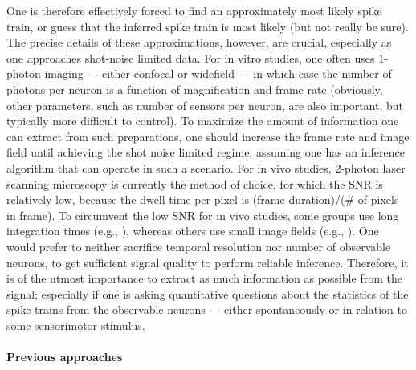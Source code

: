 One is therefore effectively forced to find an approximately most likely spike train, or guess that the inferred spike train is most likely (but not really be sure).  The precise details of these approximations, however, are crucial, especially as one approaches shot-noise limited data. For in vitro studies, one often uses 1-photon imaging --- either confocal or widefield --- in which case the number of photons per neuron is a function of magnification and frame rate (obviously, other parameters, such as number of sensors per neuron, are also important, but typically more difficult to control).  To maximize the amount of information one can extract from such preparations, one should increase the frame rate and image field until achieving the shot noise limited regime, assuming one has an inference algorithm that can operate in such a scenario.  For in vivo studies, 2-photon laser scanning microscopy is currently the method of choice, for which the SNR is relatively low,  because the dwell time per pixel is (frame duration)/($\#$ of pixels in frame).  To circumvent the low SNR for in vivo studies, some groups use long integration times (e.g., \cite{OhkiReid06}), whereas others use small image fields (e.g., \cite{KerrHelmchen07}).  One would prefer to neither sacrifice temporal resolution nor number of observable neurons, to get sufficient signal quality to perform reliable inference.  Therefore, it is of the utmost importance to extract as much information as possible from the signal; especially if one is asking quantitative questions about the statistics of the spike trains from the observable neurons --- either spontaneously or in relation to some sensorimotor stimulus.

\paragraph{Previous approaches}


